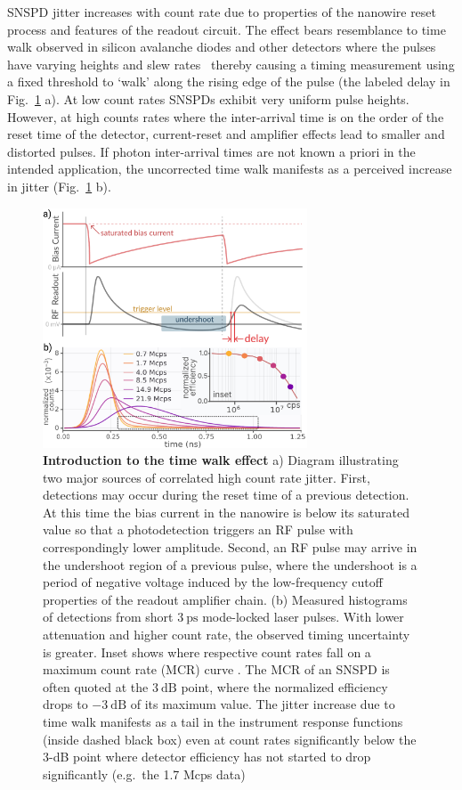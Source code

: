 \documentclass[11pt]{caltech_thesis} %
\begin{document}
SNSPD jitter increases with count rate due to properties of the nanowire reset process and features of the readout circuit. The effect bears resemblance to time walk observed in silicon avalanche diodes and other detectors where the pulses have varying heights and slew rates~\autocite{SPAD_walk_Kirchnir_1997} thereby causing a timing measurement using a fixed threshold to `walk' along the rising edge of the pulse (the labeled delay in Fig.~\ref{fig:jitterate_intro} a).
At low count rates SNSPDs exhibit very uniform pulse heights. However, at high counts rates where the inter-arrival time is on the order of the reset time of the detector, current-reset and amplifier effects lead to smaller and distorted pulses. If photon inter-arrival times are not known a priori in the intended application, the uncorrected time walk manifests as a perceived increase in jitter (Fig.~\ref{fig:jitterate_intro} b).

\hypertarget{fig:jitterate_intro}{%
\begin{figure}
\centering
\includegraphics[width=0.7\textwidth,height=\textheight]{./chapter_03/figs/intro_jitterate_light.pdf}
\caption[{Introduction to the time walk effect}]{\textbf{Introduction to the time walk effect} a) Diagram illustrating two major sources of correlated high count rate jitter. First, detections may occur during the reset time of a previous detection. At this time the bias current in the nanowire is below its saturated value so that a photodetection triggers an RF pulse with correspondingly lower amplitude. Second, an RF pulse may arrive in the undershoot region of a previous pulse, where the undershoot is a period of negative voltage induced by the low-frequency cutoff properties of the readout amplifier chain. (b) Measured histograms of detections from short $3~\mathrm{ps}$ mode-locked laser pulses. With lower attenuation and higher count rate, the observed timing uncertainty is greater. Inset shows where respective count rates fall on a maximum count rate (MCR) curve \autocite{Zhang_MCR_2019}. The MCR of an SNSPD is often quoted at the $3~\mathrm{dB}$ point, where the normalized efficiency drops to $-3~\mathrm{dB}$ of its maximum value. The jitter increase due to time walk manifests as a tail in the instrument response functions (inside dashed black box) even at count rates significantly below the 3-dB point where detector efficiency has not started to drop significantly (e.g.~the 1.7 Mcps data)}
\label{fig:jitterate_intro}
\end{figure}
}
\end{document}
